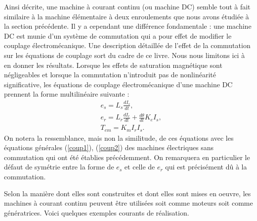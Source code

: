 Ainsi décrite, une machine à courant continu (ou machine DC) semble tout à
fait similaire à la machine élémentaire à deux enroulements que nous
avons étudiée à la section précédente. Il y a cependant une
différence fondamentale : une machine DC est munie d'un système de
commutation qui a pour effet de modifier le couplage électromécanique. Une description détaillée de l'effet de la commutation sur les
équations de couplage sort du cadre de ce livre. Nous
nous limitons ici à en donner les résultats. Lorsque les effets de
saturation magnétique sont négligeables et lorsque la commutation
n'introduit pas de nonlinéarité significative, les équations de couplage
électromécanique d'une machine DC prennent la forme multilinéaire
suivante :  
\begin{equation*} \begin{split}
&e_s = L_s \frac{dI_s}{dt}, \\[2mm]
&e_r = L_r \frac{dI_r}{dt} + \frac{d\theta}{dt}K_eI_s, \\[2mm]
&T_{em} = K_mI_rI_s.
\end{split} \end{equation*}
On notera la ressemblance, mais non la similitude, de ces équations avec les
équations générales (\ref{coup1}), (\ref{coup2}) des machines
électriques sans commutation qui ont été établies
précédemment. On remarquera en particulier le défaut de symétrie
entre la forme de $e_s$ et celle de $e_r$ qui est précisément d{\^u} à la
commutation.

Selon la manière dont elles sont construites et dont elles
sont mises en oeuvre, les machines à courant continu peuvent être
utilisées soit comme moteurs soit comme génératrices.  Voici quelques
exemples courants de réalisation. \\


